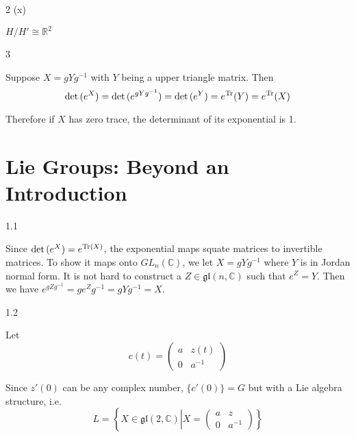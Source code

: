 \documentclass[10pt]{article}
\theoremstyle{plain}
\theoremstyle{definition}
\newenvironment{problem_hw}[1]{{\noindent\bfseries Problem #1.}}{}
\newenvironment{answer_hw}{{\noindent\em Answer.}}{}
\newcommand{\fg}{\mathfrak{g}}
\newcommand{\fl}{\mathfrak{l}}
\newcommand{\IC}{\mathbb{C}}
\newcommand{\IR}{\mathbb{R}}
\renewcommand\det{{\rm det\,}}
\newcommand{\<}{\langle}
\renewcommand{\>}{\rangle}
\begin{document}
\begin{problem_hw}{2 (x)}
\end{problem_hw}

\begin{answer_hw}
$H/H' \cong \IR^2$ \\

\end{answer_hw}


\begin{problem_hw}{3}
\end{problem_hw}

\begin{answer_hw}

Suppose $X = gYg^{-1}$ with $Y$ being a upper triangle matrix. Then $$\det(e^X) = \det(e^{gYg^{-1}}) = \det(e^Y) = e^\mathrm{Tr}(Y) = e^\mathrm{Tr}(X)$$

Therefore if $X$ has zero trace, the determinant of its exponential is 1.\\

\end{answer_hw}


\section*{Lie Groups: Beyond an Introduction}
\label{sec:Lie Groups: Beyond an Introduction}

\begin{problem_hw}{1.1}
\end{problem_hw}

\begin{answer_hw}

Since $\det(e^X) = e^{\mathrm{Tr}(X)}$, the exponential maps squate matrices to invertible matrices. To show it maps onto $GL_n(\IC)$, we let $X = gYg^{-1}$ where $Y$ is in Jordan normal form. It is not hard to construct a $Z\in \fg\fl(n,\IC)$ such that $e^Z = Y$. Then we have $e^{gZg^{-1}} = ge^Zg^{-1} = gYg^{-1} = X$. \\

\end{answer_hw}

\begin{problem_hw}{1.2}
\end{problem_hw}

\begin{answer_hw}

Let $$c(t) = \begin{pmatrix} a & z(t) \\ 0 & a^{-1} \end{pmatrix}$$

Since $z'(0)$ can be any complex number, $\{c'(0)\} = G$ but with a Lie algebra structure, i.e. $$ L = \left\{X\in\fg\fl(2,\IC)\left| X = \begin{pmatrix} a & z \\ 0 & a^{-1} \end{pmatrix} \right.\right\}$$

\end{answer_hw}
\end{document}
